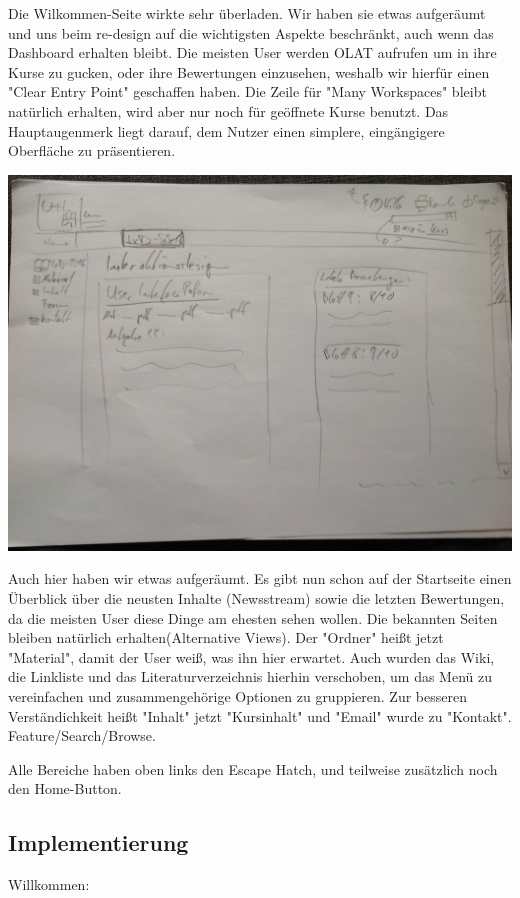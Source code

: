 \documentclass[a4paper,10pt]{article}
\begin{document}
Die Wilkommen-Seite wirkte sehr überladen. Wir haben sie etwas aufgeräumt und uns beim re-design auf die wichtigsten Aspekte beschränkt, auch wenn das Dashboard erhalten bleibt. Die meisten User werden OLAT aufrufen um in ihre Kurse zu gucken, oder ihre Bewertungen einzusehen, weshalb wir hierfür einen "Clear Entry Point" geschaffen haben. Die Zeile für "Many Workspaces" bleibt natürlich erhalten, wird aber nur noch für geöffnete Kurse benutzt. Das Hauptaugenmerk liegt darauf, dem Nutzer einen simplere, eingängigere Oberfläche zu präsentieren.

\includegraphics[scale=0.18]{images/IMG_0364.JPG}

Auch hier haben wir etwas aufgeräumt. Es gibt nun schon auf der Startseite einen Überblick über die neusten Inhalte (Newsstream) sowie die letzten Bewertungen, da die meisten User diese Dinge am ehesten sehen wollen. Die bekannten Seiten bleiben natürlich erhalten(Alternative Views). Der "Ordner" heißt jetzt "Material", damit der User weiß, was ihn hier erwartet. Auch wurden das Wiki, die Linkliste und das Literaturverzeichnis hierhin verschoben, um das Menü zu vereinfachen und zusammengehörige Optionen zu gruppieren. Zur besseren Verständichkeit heißt "Inhalt" jetzt "Kursinhalt" und "Email" wurde zu "Kontakt". Feature/Search/Browse.

Alle Bereiche haben oben links den Escape Hatch, und teilweise zusätzlich noch den Home-Button. 

\subsection{Implementierung} 
Willkommen:
\end{document}
